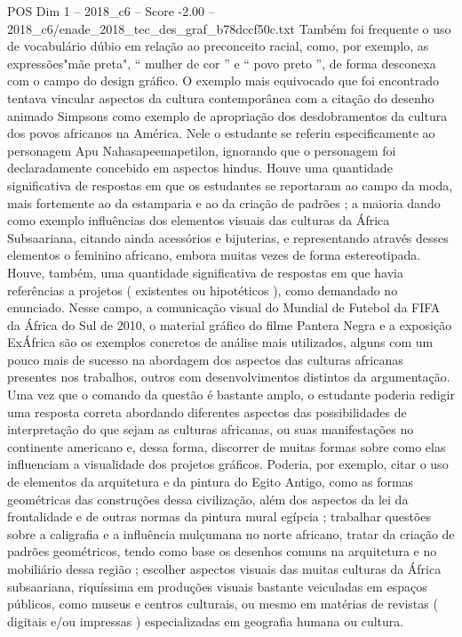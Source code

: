 \begin{textsample}{POS Dim 1 – 2018\_c6 – Score -2.00 – 2018\_c6/enade\_2018\_tec\_des\_graf\_b78dccf50c.txt}
Também foi frequente o uso de vocabulário dúbio em relação ao preconceito racial, como, por exemplo, as expressões"mãe preta", “ mulher de cor ” e “ povo preto ”, de forma desconexa com o campo do design gráfico.
O exemplo mais equivocado que foi encontrado tentava vincular aspectos da cultura contemporânea com a citação do desenho animado Simpsons como exemplo de apropriação dos desdobramentos da cultura dos povos africanos na América.
Nele o estudante se referiu especificamente ao personagem Apu Nahasapeemapetilon, ignorando que o personagem foi declaradamente concebido em aspectos hindus.
Houve uma quantidade significativa de respostas em que os estudantes se reportaram ao campo da moda, mais fortemente ao da estamparia e ao da criação de padrões ; a maioria dando como exemplo influências dos elementos visuais das culturas da África Subsaariana, citando ainda acessórios e bijuterias, e representando através desses elementos o feminino africano, embora muitas vezes de forma estereotipada.
Houve, também, uma quantidade significativa de respostas em que havia referências a projetos ( existentes ou hipotéticos ), como demandado no enunciado.
Nesse campo, a comunicação visual do Mundial de Futebol da FIFA da África do Sul de 2010, o material gráfico do filme Pantera Negra e a exposição ExÁfrica são os exemplos concretos de análise mais utilizados, alguns com um pouco mais de sucesso na abordagem dos aspectos das culturas africanas presentes nos trabalhos, outros com desenvolvimentos distintos da argumentação.
Uma vez que o comando da questão é bastante amplo, o estudante poderia redigir uma resposta correta abordando diferentes aspectos das possibilidades de interpretação do que sejam as culturas africanas, ou suas manifestações no continente americano e, dessa forma, discorrer de muitas formas sobre como elas influenciam a visualidade dos projetos gráficos.
Poderia, por exemplo, citar o uso de elementos da arquitetura e da pintura do Egito Antigo, como as formas geométricas das construções dessa civilização, além dos aspectos da lei da frontalidade e de outras normas da pintura mural egípcia ; trabalhar questões sobre a caligrafia e a influência mulçumana no norte africano, tratar da criação de padrões geométricos, tendo como base os desenhos comuns na arquitetura e no mobiliário dessa região ; escolher aspectos visuais das muitas culturas da África subsaariana, riquíssima em produções visuais bastante veiculadas em espaços públicos, como museus e centros culturais, ou mesmo em matérias de revistas ( digitais e/ou impressas ) especializadas em geografia humana ou cultura.

\end{textsample}
